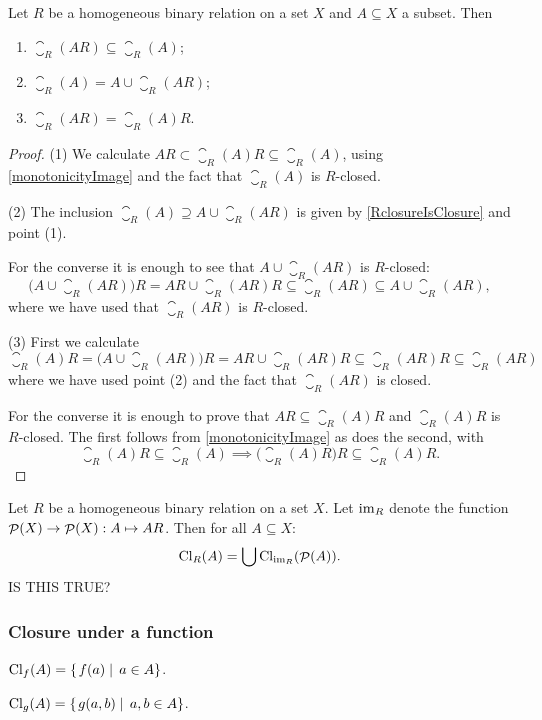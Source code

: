 \begin{lemma}
Let $R$ be a homogeneous binary relation on a set $X$ and $A\subseteq X$ a subset. Then
\begin{enumerate}
\item $\closure_R(AR) \subseteq \closure_R(A)$;
\item $\closure_R(A) = A \cup \closure_R(AR)$;
\item $\closure_R(AR) = \closure_R(A)R$.
\end{enumerate}
\end{lemma}
\begin{proof}
(1) We calculate $AR \subset \closure_R(A)R \subseteq \closure_R(A)$, using \ref{monotonicityImage} and the fact that $\closure_R(A)$ is $R$-closed.

(2) The inclusion $\closure_R(A) \supseteq A \cup \closure_R(AR)$ is given by \ref{RclosureIsClosure} and point (1).

For the converse it is enough to see that $A \cup \closure_R(AR)$ is $R$-closed:
\[ \big(A \cup \closure_R(AR)\big)R = AR \cup \closure_R(AR)R \subseteq \closure_R(AR) \subseteq A \cup \closure_R(AR), \]
where we have used that $\closure_R(AR)$ is $R$-closed.

(3) First we calculate
\[ \closure_R(A)R = \big(A \cup \closure_R(AR)\big)R = AR \cup \closure_R(AR)R \subseteq \closure_R(AR)R \subseteq \closure_R(AR) \]
where we have used point (2) and the fact that $\closure_R(AR)$ is closed.

For the converse it is enough to prove that $AR \subseteq \closure_R(A)R$ and $\closure_R(A)R$ is $R$-closed. The first follows from \ref{monotonicityImage} as does the second, with
\[ \closure_R(A)R \subseteq \closure_R(A) \implies \big(\closure_R(A)R\big)R \subseteq \closure_R(A)R. \]
\end{proof}

\begin{lemma}
Let $R$ be a homogeneous binary relation on a set $X$. Let $\operatorname{im}_R$ denote the function $\mathop{\mathcal{P}}(X) \to \mathop{\mathcal{P}}(X): A \mapsto AR$. Then for all $A\subseteq X$:
\[ \operatorname{Cl}_R(A) = \bigcup \operatorname{Cl}_{\operatorname{im}_R}(\mathop{\mathcal{P}}(A)). \]
IS THIS TRUE?
\end{lemma}


\subsubsection{Closure under a function}

\begin{lemma}
$\operatorname{Cl}_f(A) = \left\{\left. f(a) \;\right|\; a\in A \right\}$.

$\operatorname{Cl}_g(A) = \left\{\left. g(a,b) \;\right|\; a,b\in A \right\}$.
\end{lemma}